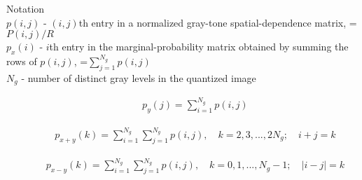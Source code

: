 \documentclass[8pt]{article}
\begin{document}
Notation \\

\quad\(p(i,j)\) - \((i,j)\)th entry in a normalized gray-tone spatial-dependence matrix, = \(P(i,j)/R\) \\

\quad\(p_x(i)\) - \(i\)th entry in the marginal-probability matrix obtained by summing the rows of \(p(i,j)\), =\(\sum_{j=1}^{N_g}p(i,j)\) \\

\quad\(N_g\) - number of distinct gray levels in  the quantized image

\begin{fleqn}
\begin{align}
   \quad\quad\;\; p_y(j) = \sum_{i=1}^{N_g}p(i,j) 
\end{align}
\end{fleqn}

\begin{fleqn}
\begin{align}
   \quad\quad\;\; p_{x+y}(k) = \sum_{i=1}^{N_g}\sum_{j=1}^{N_g}p(i,j), \quad k=2,3,...,2N_g; \quad i+j=k
\end{align}
\end{fleqn}

\begin{fleqn}
\begin{align}
   \quad\quad\;\; p_{x-y}(k) = \sum_{i=1}^{N_g}\sum_{j=1}^{N_g}p(i,j), \quad k=0,1,...,N_g-1; \quad |i-j|=k
\end{align}
\end{fleqn}
\end{document}
